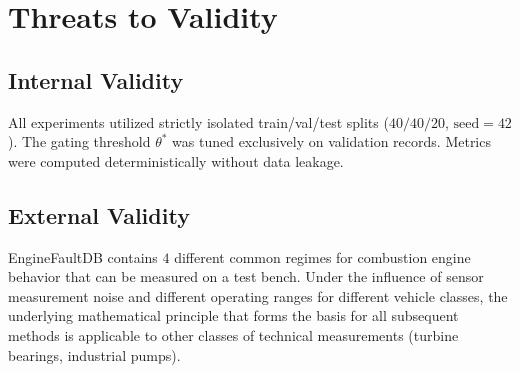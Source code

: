 \documentclass[journal]{IEEEtran}
\begin{document}
\section{Threats to Validity}
\subsection{Internal Validity}
All experiments utilized strictly isolated train/val/test splits ($40/40/20$, $\text{seed}=42$). The gating threshold $\theta^*$ was tuned exclusively on validation records. Metrics were computed deterministically without data leakage.

\subsection{External Validity}
EngineFaultDB contains $4$ different common regimes for combustion engine behavior that can be measured on a test bench. Under the influence of sensor measurement noise and different operating ranges for different vehicle classes, the underlying mathematical principle that forms the basis for all subsequent methods is applicable to other classes of technical measurements (turbine bearings, industrial pumps).
\end{document}
